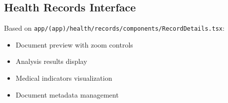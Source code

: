 \subsection{Health Records Interface}
Based on \texttt{app/(app)/health/records/components/RecordDetails.tsx}:

\begin{itemize}
    \item Document preview with zoom controls
    \item Analysis results display
    \item Medical indicators visualization
    \item Document metadata management
\end{itemize} 